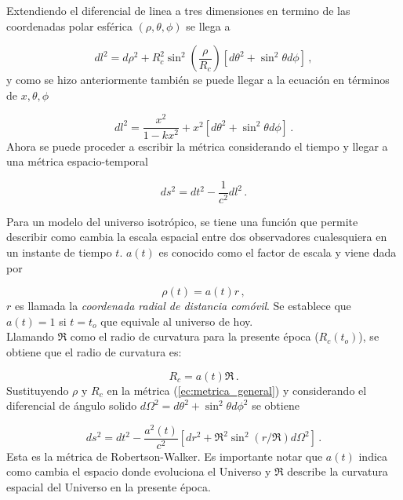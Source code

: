 
Extendiendo el diferencial de linea a tres dimensiones en termino de las coordenadas polar esférica $(\rho, \theta, \phi)$ se llega a 

\begin{equation}
dl^{2}=d\rho^{2}+R^{2}_{c}\sin^{2}\left(\frac{\rho}{R_{c}}\right)[d\theta^{2}+\sin^{2}\theta d\phi]\,,
\end{equation}
%
y como se hizo anteriormente también se puede llegar a la ecuación en términos de $x, \theta, \phi$

\begin{equation}
dl^{2}=\frac{x^{2}}{1-kx^{2}}+ x^{2}[d\theta^{2}+\sin^{2}\theta d\phi]\,.
\end{equation}
%
Ahora se puede proceder a escribir la métrica considerando el tiempo y llegar a una métrica espacio-temporal   

\begin{equation}
ds^{2}=dt^{2}-\frac{1}{c^{2}}dl^{2}\,.
\label{ec:metrica_general}
\end{equation}

Para un modelo del universo isotrópico, se tiene una función que permite describir como cambia la escala espacial entre dos observadores cualesquiera en un instante de tiempo $t$. $a(t)$ es conocido como el factor de escala y viene dada por 

\begin{equation}
\rho(t)=a(t)r\,,
\end{equation} 
%
$r$ es llamada la \textit{ coordenada radial de distancia comóvil}. Se establece que $a(t)=1$ si $t=t_{o}$ que equivale al universo de hoy.\\

Llamando $\Re$ como el radio de curvatura para la presente época ($R_{c}(t_o)$), se obtiene  que el radio de curvatura es: 

\begin{equation}
R_{c}=a(t)\Re \,.
\end{equation}
%
Sustituyendo $\rho$ y $R_{c}$ en la métrica (\ref{ec:metrica_general}) y considerando el diferencial de ángulo solido $d\Omega^{2}=d\theta^{2}+\sin^{2}\theta d\phi^{2}$ se obtiene 

\begin{equation}
ds^{2}=dt^{2}-\frac{a^{2}(t)}{c^{2}}[dr^{2}+\Re^{2}\sin^{2}(r/\Re)d\Omega^{2}]\,.
\end{equation}
%
Esta es la métrica de Robertson-Walker. Es importante notar que $a(t)$ indica como cambia el espacio donde evoluciona el Universo y $\Re$ describe la curvatura espacial del Universo en la presente época.

